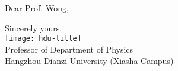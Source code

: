 \documentclass[mode = stationery]{hduthesis}
\begin{document}
\maketitle

Dear Prof. Wong,

\lipsum[1-2]

\vfill \raggedleft

Sincerely yours,\\[4ex]
\texttt{[image: hdu-title]}\\[2ex]
Professor of Department of Physics\\
Hangzhou Dianzi University (Xiasha Campus)

\vspace{\baselineskip}

\clearpage

\notelines[25]
\end{document}
